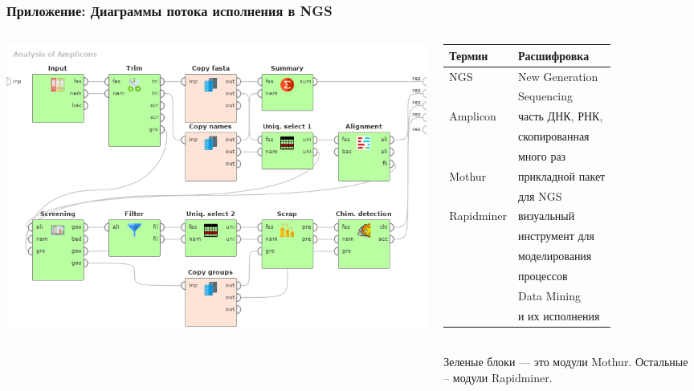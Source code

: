 \documentclass[handout]{beamer}
\begin{document}
\begin{frame}[fragile]
  \frametitle{Приложение: Диаграммы потока исполнения в NGS}
  \begin{columns}
    \begin{column}{0.6\textwidth}
      \begin{raggedright}
        \includegraphics[width=1\linewidth]{Dataflow-color-en.png}
      \end{raggedright}
    \end{column}
    \begin{column}{0.4\textwidth}\footnotesize
      \begin{tabular}{ll}
        Термин & Расшифровка \\
        \hline
        NGS & New Generation \\
               & Sequencing \\
        Amplicon & часть ДНК, РНК, \\
               & скопированная \\
               & много раз \\
        Mothur & прикладной пакет \\
               & для NGS \\
        Rapidminer & визуальный \\
               & инструмент для \\
               & моделирования \\
               & процессов \\
               & Data Mining\\
               & и их исполнения
      \end{tabular}
      ${}$\\[1em]
      Зеленые блоки — это модули Mothur. Остальные -- модули Rapidminer.
    \end{column}
  \end{columns}
\end{frame}
\end{document}
